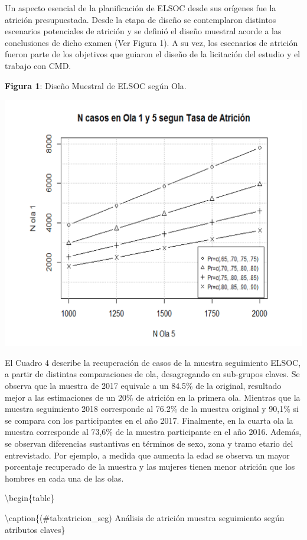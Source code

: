 \documentclass[
]{book}
\begin{document}
Un aspecto esencial de la planificación de ELSOC desde sus orígenes fue la atrición presupuestada. Desde la etapa de diseño se contemplaron distintos escenarios potenciales de atrición y se definió el diseño muestral acorde a las conclusiones de dicho examen (Ver Figura 1). A su vez, los escenarios de atrición fueron parte de los objetivos que guiaron el diseño de la licitación del estudio y el trabajo con CMD.

\textbf{Figura 1}: Diseño Muestral de ELSOC según Ola.

\begin{center}\includegraphics[width=0.6\linewidth,height=0.6\textheight]{imagenes/attrition} \end{center}

El Cuadro 4 describe la recuperación de casos de la muestra seguimiento ELSOC, a partir de distintas comparaciones de ola, desagregando en sub-grupos claves. Se observa que la muestra de 2017 equivale a un 84.5\% de la original, resultado mejor a las estimaciones de un 20\% de atrición en la primera ola. Mientras que la muestra seguimiento 2018 corresponde al 76.2\% de la muestra original y 90,1\% si se compara con los participantes en el año 2017. Finalmente, en la cuarta ola la muestra corresponde al 73,6\% de la muestra participante en el año 2016.
Además, se observan diferencias sustantivas en términos de sexo, zona y tramo etario del entrevistado. Por ejemplo, a medida que aumenta la edad se observa un mayor porcentaje recuperado de la muestra y las mujeres tienen menor atrición que los hombres en cada una de las olas.

\textbackslash begin\{table\}

\textbackslash caption\{(\#tab:atricion\_seg)\label{tab:atricionseg} Análisis de atrición muestra seguimiento según atributos claves\}
\centering
\end{document}
